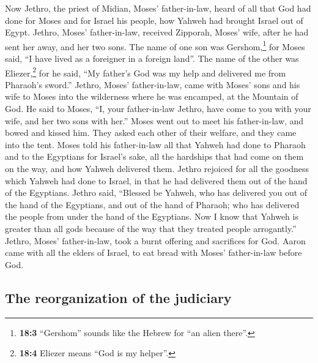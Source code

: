  Now Jethro, the priest of Midian, Moses' father-in-law,
heard of all that God had done for Moses and for Israel his people, how
Yahweh had brought Israel out of Egypt.  Jethro, Moses'
father-in-law, received Zipporah, Moses' wife, after he had sent her
away,  and her two sons. The name of one son was
Gershom,\footnote{\textbf{18:3} ``Gershom'' sounds like the Hebrew for
  ``an alien there''.} for Moses said, ``I have lived as a foreigner in
a foreign land''.  The name of the other was
Eliezer,\footnote{\textbf{18:4} Eliezer means ``God is my helper''.} for
he said, ``My father's God was my help and delivered me from Pharaoh's
sword.''  Jethro, Moses' father-in-law, came with Moses'
sons and his wife to Moses into the wilderness where he was encamped, at
the Mountain of God.  He said to Moses, ``I, your
father-in-law Jethro, have come to you with your wife, and her two sons
with her.''  Moses went out to meet his father-in-law, and
bowed and kissed him. They asked each other of their welfare, and they
came into the tent.  Moses told his father-in-law all that
Yahweh had done to Pharaoh and to the Egyptians for Israel's sake, all
the hardships that had come on them on the way, and how Yahweh delivered
them.  Jethro rejoiced for all the goodness which Yahweh
had done to Israel, in that he had delivered them out of the hand of the
Egyptians.  Jethro said, ``Blessed be Yahweh, who has
delivered you out of the hand of the Egyptians, and out of the hand of
Pharaoh; who has delivered the people from under the hand of the
Egyptians.  Now I know that Yahweh is greater than all
gods because of the way that they treated people arrogantly.''
 Jethro, Moses' father-in-law, took a burnt offering and
sacrifices for God. Aaron came with all the elders of Israel, to eat
bread with Moses' father-in-law before God.

\hypertarget{the-reorganization-of-the-judiciary}{%
\subsection{The reorganization of the
judiciary}\label{the-reorganization-of-the-judiciary}}

